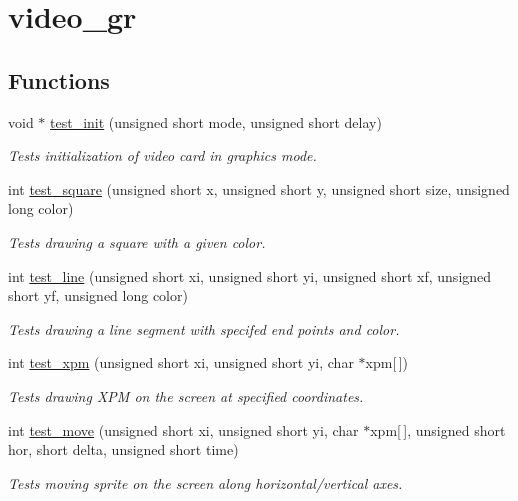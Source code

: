 \hypertarget{group__video__gr}{}\section{video\+\_\+gr}
\label{group__video__gr}
\subsection*{Functions}
\begin{DoxyCompactItemize}
\item 
void $\ast$ \hyperlink{group__video__gr_ga6e39c6cb8202eb0246f40572deef605a}{test\+\_\+init} (unsigned short mode, unsigned short delay)
\begin{DoxyCompactList}\small\item\em Tests initialization of video card in graphics mode. \end{DoxyCompactList}\item 
int \hyperlink{group__video__gr_ga41ec579061f8d7e2dc435e94efaac75e}{test\+\_\+square} (unsigned short x, unsigned short y, unsigned short size, unsigned long color)
\begin{DoxyCompactList}\small\item\em Tests drawing a square with a given color. \end{DoxyCompactList}\item 
int \hyperlink{group__video__gr_gaddb118e00aa3152b6b6445f77a95b189}{test\+\_\+line} (unsigned short xi, unsigned short yi, unsigned short xf, unsigned short yf, unsigned long color)
\begin{DoxyCompactList}\small\item\em Tests drawing a line segment with specifed end points and color. \end{DoxyCompactList}\item 
int \hyperlink{group__video__gr_ga4dfc8ee51e363da1ecfe9fba1210bdb2}{test\+\_\+xpm} (unsigned short xi, unsigned short yi, char $\ast$xpm\mbox{[}$\,$\mbox{]})
\begin{DoxyCompactList}\small\item\em Tests drawing X\+P\+M on the screen at specified coordinates. \end{DoxyCompactList}\item 
int \hyperlink{group__video__gr_ga07be3b073d0119c528934e24c0312c87}{test\+\_\+move} (unsigned short xi, unsigned short yi, char $\ast$xpm\mbox{[}$\,$\mbox{]}, unsigned short hor, short delta, unsigned short time)
\begin{DoxyCompactList}\small\item\em Tests moving sprite on the screen along horizontal/vertical axes. \end{DoxyCompactList}\item 

\end{DoxyCompactItemize}
